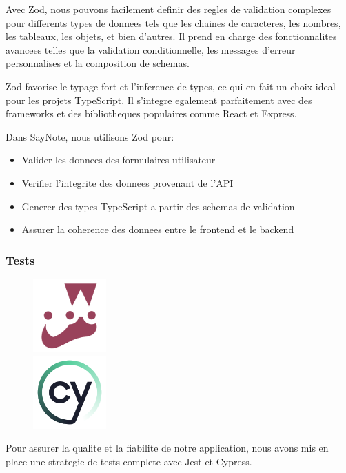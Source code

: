 Avec Zod, nous pouvons facilement definir des regles de validation complexes pour differents types de donnees tels que les chaines de caracteres, les nombres, les tableaux, les objets, et bien d'autres. Il prend en charge des fonctionnalites avancees telles que la validation conditionnelle, les messages d'erreur personnalises et la composition de schemas.

Zod favorise le typage fort et l'inference de types, ce qui en fait un choix ideal pour les projets TypeScript. Il s'integre egalement parfaitement avec des frameworks et des bibliotheques populaires comme React et Express. 

Dans SayNote, nous utilisons Zod pour:
\begin{itemize}
    \item Valider les donnees des formulaires utilisateur
    \item Verifier l'integrite des donnees provenant de l'API
    \item Generer des types TypeScript a partir des schemas de validation
    \item Assurer la coherence des donnees entre le frontend et le backend
\end{itemize}

\subsubsection{Tests}
\begin{figure}
    \centering
    \includegraphics[width=0.25\textwidth]{assets/docs/jest.png}\\
    \vspace{0.5cm}
    \includegraphics[width=0.25\textwidth]{assets/docs/cypress.png}
\end{figure}
Pour assurer la qualite et la fiabilite de notre application, nous avons mis en place une strategie de tests complete avec Jest et Cypress.


